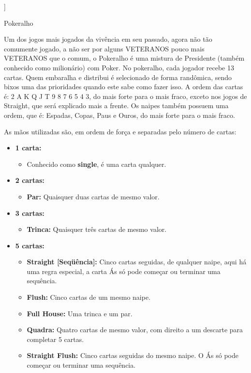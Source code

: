 ]\begin{subsecao}{Pokeralho}

Um dos jogos mais jogados da vivência em seu passado, agora não tão comumente
jogado, a não ser por alguns VETERANOS pouco mais VETERANOS que o comum, o
Pokeralho é uma mistura de Presidente (também conhecido como milionário) com
Poker. No pokeralho, cada jogador recebe 13 cartas. Quem embaralha e distribui é
selecionado de forma randômica, sendo bixos uma das prioridades quando este sabe
como fazer isso. A ordem das cartas é: 2 A K Q J T 9 8 7 6 5 4 3, do mais forte
para o mais fraco, exceto nos jogos de Straight, que será explicado mais a
frente. Os naipes também possuem uma ordem, que é: Espadas, Copas, Paus e Ouros,
do mais forte para o mais fraco.

As mãos utilizadas são, em ordem de força e separadas pelo número de cartas:
\begin{itemize}

\item \textbf {1 carta:}
\begin{itemize}
\item Conhecido como \textbf{single}, é uma carta qualquer.
\end{itemize}
\item \textbf {2 cartas:}
\begin{itemize}

\item \textbf{Par:} Quaisquer duas cartas de mesmo valor.
\end{itemize}
\item \textbf {3 cartas:}

\begin{itemize}
\item \textbf{Trinca:} Quaisquer três cartas de mesmo valor.
\end{itemize}
\item \textbf {5 cartas:}

\begin{itemize}
\item \textbf{Straight [Seqüência]:} Cinco cartas seguidas, de qualquer naipe,
aqui há uma regra especial, a carta Ás só pode começar ou terminar uma
sequência.
\item \textbf{Flush:} Cinco cartas de um mesmo naipe.
\item \textbf{Full House:} Uma trinca e um par.
\item \textbf{Quadra:} Quatro cartas de mesmo valor, com direito a um descarte
para completar 5 cartas.
\item \textbf{Straight Flush:} Cinco cartas seguidas do mesmo naipe. O Ás só
pode começar ou terminar uma sequência. 
\end{itemize}


\end{itemize}
\end{subsecao}
